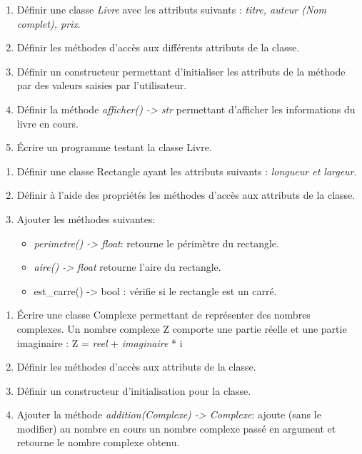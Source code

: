 \documentclass[a4paper,11pt]{article}
\begin{document}
\begin{Form}
\begin{exo}
\begin{enumerate}
\item Définir une classe \emph{Livre} avec les attributs suivants : \emph{titre, auteur (Nom complet), prix}.
\item Définir les méthodes d’accès aux différents attributs de la classe.
\item Définir un constructeur permettant d’initialiser les attributs de la méthode par des valeurs saisies par l’utilisateur.
\item Définir la méthode \emph{afficher() -> str} permettant d’afficher les informations du livre en cours.
\item Écrire un programme testant la classe Livre.
\end{enumerate}
\end{exo}
\begin{exo}
\begin{enumerate}
\item Définir une classe Rectangle ayant les attributs suivants : \emph{longueur et largeur}.
\item Définir à l’aide des propriétés les méthodes d’accès aux attributs de la classe.
\item Ajouter les méthodes suivantes:
\begin{itemize}
\item \emph{perimetre() -> float}: retourne le périmètre du rectangle.
\item \emph{aire() -> float} retourne l'aire du rectangle.
\item est\_carre() -> bool : vérifie si le rectangle est un carré.
\end{itemize}
\end{enumerate}
\end{exo}
\begin{exo}
\begin{enumerate}
\item Écrire une classe Complexe permettant de représenter des nombres complexes. Un nombre complexe Z comporte une partie réelle et une partie imaginaire :                             Z = \emph{reel} + \emph{imaginaire} * i
\item Définir les méthodes d’accès aux attributs de la classe.
\item Définir un constructeur d’initialisation pour la classe.
\item Ajouter la méthode \emph{addition(Complexe) -> Complexe}: ajoute (sans le modifier) au nombre en cours un nombre complexe passé en argument et retourne le nombre complexe obtenu.

\end{enumerate}
\end{exo}
\end{Form}
\end{document}
